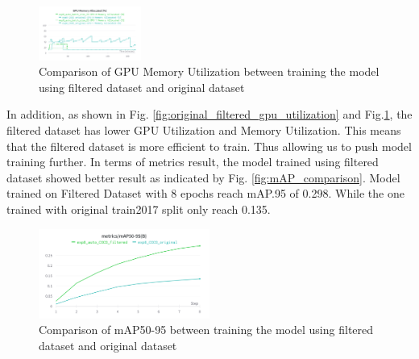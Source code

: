 \documentclass[conference]{IEEEtran}
\begin{document}
\begin{figure}[h!]
\centering
\includegraphics[width=0.3\textwidth,keepaspectratio]{memory_utilization_comparison_original_and_filtered.png}
\caption{Comparison of GPU Memory Utilization between training the model using filtered dataset and original dataset}
\label{fig:original_filtered_memory_utilization}
\end{figure}
In addition, as shown in Fig. \ref{fig:original_filtered_gpu_utilization} and Fig.\ref{fig:original_filtered_memory_utilization}, the filtered dataset has lower GPU Utilization and Memory Utilization. This means that the filtered dataset is more efficient to train.
Thus allowing us to push model training further. 
In terms of metrics result, the model trained using filtered dataset showed better result as indicated by Fig. \ref{fig:mAP_comparison}. Model trained on Filtered Dataset with 8 epochs reach mAP.95 of 0.298. While the one trained with original train2017 split only reach 0.135.
\begin{figure}
    \centering
    \includegraphics[width=0.5\textwidth,keepaspectratio]{comparison_mAP_filtered.png}
    \caption{Comparison of mAP50-95 between training the model using filtered dataset and original dataset}
\end{figure}
\end{document}
